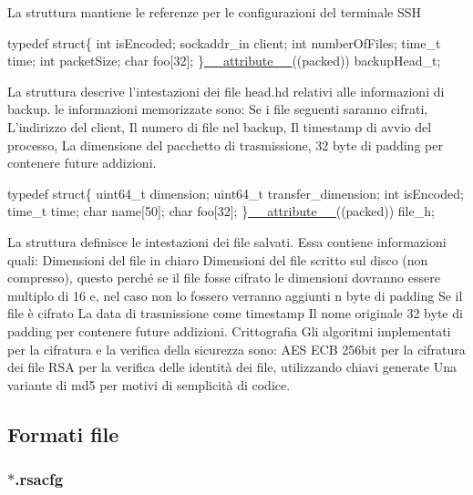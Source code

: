 La struttura mantiene le referenze per le configurazioni del terminale S\+SH 
\begin{DoxyCode}
\textcolor{keyword}{typedef} \textcolor{keyword}{struct}\{
   \textcolor{keywordtype}{int} isEncoded;
   sockaddr\_in client;
   \textcolor{keywordtype}{int} numberOfFiles;
   time\_t time;
   \textcolor{keywordtype}{int} packetSize;
   \textcolor{keywordtype}{char} foo[32];
\}\hyperlink{struct____attribute____}{\_\_attribute\_\_}((packed)) backupHead\_t;
\end{DoxyCode}


La struttura descrive l’intestazioni dei file head.\+hd relativi alle informazioni di backup. le informazioni memorizzate sono\+: Se i file seguenti saranno cifrati, L’indirizzo del client, Il numero di file nel backup, Il timestamp di avvio del processo, La dimensione del pacchetto di trasmissione, 32 byte di padding per contenere future addizioni. 
\begin{DoxyCode}
\textcolor{keyword}{typedef} \textcolor{keyword}{struct}\{
   uint64\_t dimension;
   uint64\_t transfer\_dimension;
   \textcolor{keywordtype}{int} isEncoded;
   time\_t time;
   \textcolor{keywordtype}{char} name[50];
   \textcolor{keywordtype}{char} foo[32];
\}\hyperlink{struct____attribute____}{\_\_attribute\_\_}((packed)) file\_h;
\end{DoxyCode}


La struttura definisce le intestazioni dei file salvati. Essa contiene informazioni quali\+: Dimensioni del file in chiaro Dimensioni del file scritto sul disco (non compresso), questo perché se il file fosse cifrato le dimensioni dovranno essere multiplo di 16 e, nel caso non lo fossero verranno aggiunti n byte di padding Se il file è cifrato La data di trasmissione come timestamp Il nome originale 32 byte di padding per contenere future addizioni. Crittografia Gli algoritmi implementati per la cifratura e la verifica della sicurezza sono\+: A\+ES E\+CB 256bit per la cifratura dei file R\+SA per la verifica delle identità dei file, utilizzando chiavi generate Una variante di md5 per motivi di semplicità di codice.

\subsection*{Formati file}

\subsubsection*{$\ast$.rsacfg}

